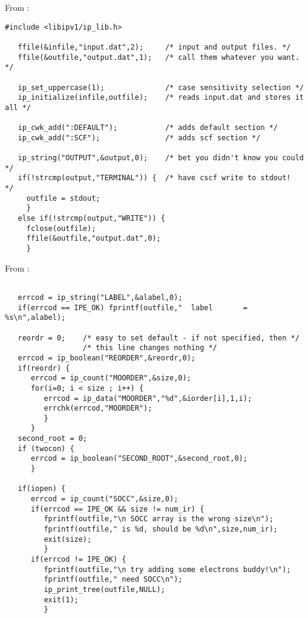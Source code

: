 From :
\begin{verbatim}
#include <libipv1/ip_lib.h>

   ffile(&infile,"input.dat",2);     /* input and output files. */
   ffile(&outfile,"output.dat",1);   /* call them whatever you want. */

   ip_set_uppercase(1);              /* case sensitivity selection */
   ip_initialize(infile,outfile);    /* reads input.dat and stores it all */

   ip_cwk_add(":DEFAULT");           /* adds default section */
   ip_cwk_add(":SCF");               /* adds scf section */

   ip_string("OUTPUT",&output,0);    /* bet you didn't know you could */
   if(!strcmp(output,"TERMINAL")) {  /* have cscf write to stdout!    */
     outfile = stdout;
     }
   else if(!strcmp(output,"WRITE")) {
     fclose(outfile);
     ffile(&outfile,"output.dat",0);
     }
\end{verbatim}

From :
\begin{verbatim}

   errcod = ip_string("LABEL",&alabel,0);
   if(errcod == IPE_OK) fprintf(outfile,"  label       = %s\n",alabel);

   reordr = 0;    /* easy to set default - if not specified, then */
                  /* this line changes nothing */
   errcod = ip_boolean("REORDER",&reordr,0); 
   if(reordr) {
      errcod = ip_count("MOORDER",&size,0);
      for(i=0; i < size ; i++) {
         errcod = ip_data("MOORDER","%d",&iorder[i],1,i);
         errchk(errcod,"MOORDER");
         }
      }
   second_root = 0;
   if (twocon) {
      errcod = ip_boolean("SECOND_ROOT",&second_root,0);
      }

   if(iopen) {
      errcod = ip_count("SOCC",&size,0);
      if(errcod == IPE_OK && size != num_ir) {
         fprintf(outfile,"\n SOCC array is the wrong size\n");
         fprintf(outfile," is %d, should be %d\n",size,num_ir);
         exit(size);
         }
      if(errcod != IPE_OK) {
         fprintf(outfile,"\n try adding some electrons buddy!\n");
         fprintf(outfile," need SOCC\n");
         ip_print_tree(outfile,NULL);
         exit(1);
         }
\end{verbatim}

